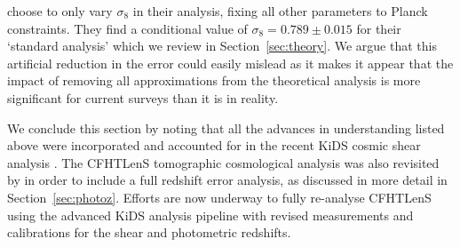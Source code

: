 \citet{kitching/etal:2016} choose to only vary $\sigma_8$ in their analysis, fixing all other parameters to Planck constraints.  They find a conditional value of $\sigma_8 = 0.789 \pm 0.015$ for their `standard analysis' which we review in Section~\ref{sec:theory}.    We argue that this artificial reduction in the error could easily mislead as it makes it appear that the impact of removing all approximations from the theoretical analysis is more significant for current surveys than it is in reality.

We conclude this section by noting that all the advances in understanding listed above were incorporated and accounted for in the recent KiDS cosmic shear analysis \citep{hildebrandt/etal:2016}.  The CFHTLenS tomographic cosmological analysis was also revisited by \citet{joudaki/etal:2016} in order to include a full redshift error analysis, as discussed in more detail in Section~\ref{sec:photoz}.  Efforts are now underway to fully re-analyse CFHTLenS using the advanced KiDS analysis pipeline with revised measurements and calibrations for the shear and photometric redshifts.  

